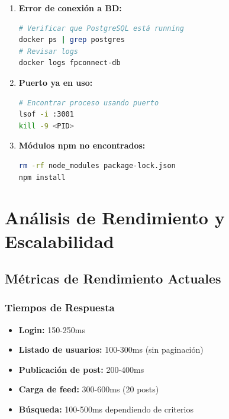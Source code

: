 \documentclass[a4paper]{report}
\begin{document}
\begin{enumerate}
  \item \textbf{Error de conexión a BD:}
  \begin{lstlisting}[language=bash]
# Verificar que PostgreSQL está running
docker ps | grep postgres
# Revisar logs
docker logs fpconnect-db
  \end{lstlisting}
  
  \item \textbf{Puerto ya en uso:}
  \begin{lstlisting}[language=bash]
# Encontrar proceso usando puerto
lsof -i :3001
kill -9 <PID>
  \end{lstlisting}
  
  \item \textbf{Módulos npm no encontrados:}
  \begin{lstlisting}[language=bash]
rm -rf node_modules package-lock.json
npm install
  \end{lstlisting}
\end{enumerate}

\newpage

\chapter{Análisis de Rendimiento y Escalabilidad}

\section{Métricas de Rendimiento Actuales}

\subsection{Tiempos de Respuesta}

\begin{itemize}
  \item \textbf{Login:} 150-250ms
  \item \textbf{Listado de usuarios:} 100-300ms (sin paginación)
  \item \textbf{Publicación de post:} 200-400ms
  \item \textbf{Carga de feed:} 300-600ms (20 posts)
  \item \textbf{Búsqueda:} 100-500ms dependiendo de criterios
\end{itemize}
\end{document}
